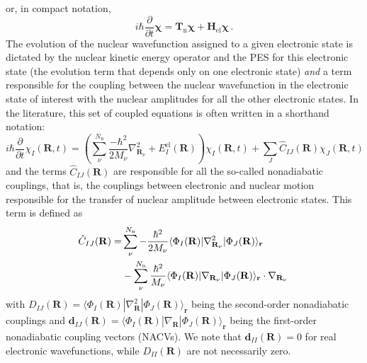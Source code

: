 \documentclass[9pt,bestpractices]{livecoms}
\newcommand{\bra}[1]{\langle #1|}
\newcommand{\ket}[1]{|#1\rangle}
\newcommand{\bs}{\mathbf}
\begin{document}
or, in compact notation,
\begin{equation} 
 i\hbar \frac{\partial}{\partial t} \boldsymbol{\chi} = \textbf{T}_\text{n} \boldsymbol{\chi} + \textbf{H}_\text{el}  \boldsymbol{\chi}
    \, .
\label{eq:matrixtdsecomp}
\end{equation}
The evolution of the nuclear wavefunction assigned to a given electronic state is dictated by the nuclear kinetic energy operator and the PES for this electronic state (the evolution term that depends only on one electronic state) \textit{and} a term responsible for the coupling between the nuclear wavefunction in the electronic state of interest with the nuclear amplitudes for all the other electronic states. In the literature, this set of coupled equations is often written in a shorthand notation:
\begin{equation}
i\hbar\frac{\partial}{\partial t} \chi_I(\mathbf{R},t)  = \left(\sum_\nu^{N_{\text{n}}}\frac{-\hbar^2}{2M_\nu} \nabla_{\mathbf{R}_\nu}^2 + E^{\text{el}}_{I}(\mathbf{R})\right)\chi_I(\mathbf{R},t) + \sum_J \hat{C}_{IJ}(\mathbf{R}) \chi_J(\mathbf{R},t) \, 
\label{eq:tdseBH}
\end{equation}
and the terms $\hat{C}_{IJ}(\mathbf{R})$ are responsible for all the so-called nonadiabatic couplings, that is, the couplings between electronic and nuclear motion responsible for the transfer of nuclear amplitude between electronic states. This term is defined as
\begin{align}
 \hat{C}_{IJ}(\mathbf{R}) = &  \sum_\nu^{N_{\text{n}}}-\frac{\hbar^2}{2M_\nu}\bra{\Phi_I(\mathbf{R})}\nabla_{\mathbf{R_\nu}}^2\ket{\Phi_J(\mathbf{R})}_{\mathbf{r}} \notag \\ 
 & -\sum_\nu^{N_{\text{n}}}\frac{\hbar^2}{M_\nu} \bra{\Phi_I(\mathbf{R})}\nabla_{\mathbf{R_\nu}}\ket{\Phi_J(\mathbf{R})}_{\bs r}\cdot\nabla_{\mathbf{R}_\nu} \, 
\label{eq:tdseBH2}
\end{align}
with $D_{IJ}(\mathbf{R})=\bra{\Phi_I(\mathbf{R})}\nabla_{\mathbf{R}}^2\ket{\Phi_J(\mathbf{R})}_{\mathbf{r}}$ being the second-order nonadiabatic couplings and $\mathbf{d}_{IJ}(\mathbf{R})=\bra{\Phi_I(\mathbf{R})}\nabla_{\mathbf{R}}\ket{\Phi_J(\mathbf{R})}_{\bs r}$ being the first-order nonadiabatic coupling vectors (NACVs). We note that $\mathbf{d}_{II}(\mathbf{R})=0$ for real electronic wavefunctions, while $D_{II}(\mathbf{R})$ are not necessarily zero. 
\end{document}
